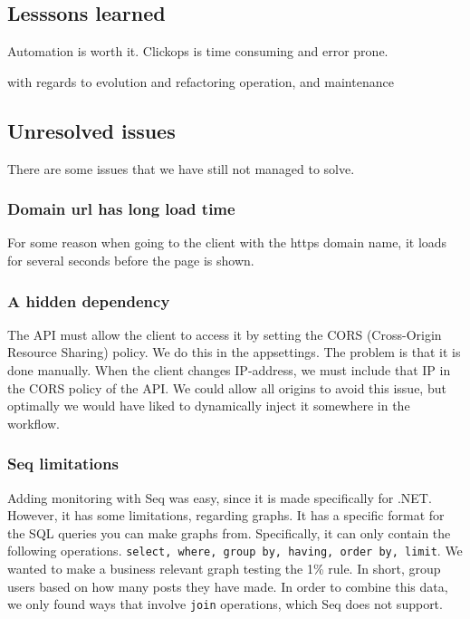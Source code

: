 \subsection{Lesssons learned}

Automation is worth it.
Clickops is time consuming and error prone.

with regards to
evolution and refactoring
operation, and
maintenance

\subsection{Unresolved issues}

There are some issues that we have still not managed to solve.

\subsubsection{Domain url has long load time}

For some reason when going to the client with the https domain name, 
it loads for several seconds before the page is shown.

\subsubsection{A hidden dependency}

The API must allow the client to access it by 
setting the CORS (Cross-Origin Resource Sharing) policy.
We do this in the appsettings. The problem is that it is done manually.
When the client changes IP-address, we must include 
that IP in the CORS policy of the API.
We could allow all origins to avoid this issue, 
but optimally we would have liked to dynamically 
inject it somewhere in the workflow.

\subsubsection{Seq limitations}

Adding monitoring with Seq was easy, since it is made specifically for .NET.
However, it has some limitations, regarding graphs.
It has a specific format for the SQL queries you can make graphs from.
Specifically, it can only contain the following operations.
\texttt{select, where, group by, having, order by, limit}.
We wanted to make a business relevant graph testing the 1\% rule\cite{1_perc_rule}.
In short, group users based on how many posts they have made.
In order to combine this data, we only found ways that involve 
\texttt{join} operations, which Seq does not support.

